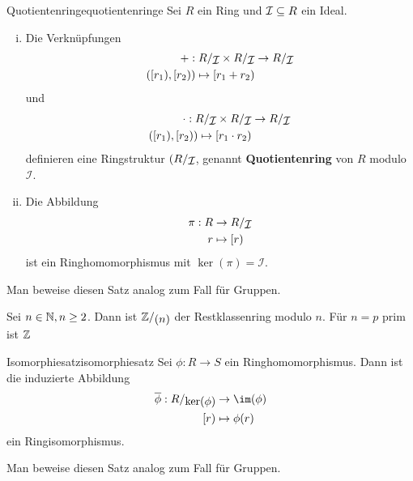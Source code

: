 \begin{satz}{Quotientenringe}{quotientenringe}
Sei $R$ ein Ring und $\mathcal{I} \subseteq R$ ein Ideal.
\begin{enumerate}[(i)]
\item Die Verknüpfungen 
\begin{equation}
\begin{split}
+: \quotient{R}{\mathcal{I}} \times \quotient{R}{\mathcal{I}} &\to \quotient{R}{\mathcal{I}}\\
([r_1), [r_2)) \mapsto [r_1 + r_2)
\end{split}
\end{equation}
und
\begin{equation}
\begin{split}
\cdot: \quotient{R}{\mathcal{I}} \times \quotient{R}{\mathcal{I}} &\to \quotient{R}{\mathcal{I}}\\
([r_1), [r_2)) \mapsto [r_1 \cdot r_2)
\end{split}
\end{equation}
definieren eine Ringstruktur $(\quotient{R}{\mathcal{I}}$, genannt \textbf{Quotientenring} von $R$ modulo $\mathcal{I}$.
\item Die Abbildung 
\begin{equation}
\begin{split}
\pi: R &\to \quotient{R}{\mathcal{I}}\\
r &\mapsto [r)
\end{split}
\end{equation}
ist ein Ringhomomorphismus mit $\ker (\pi) = \mathcal{I}$.
\end{enumerate}
\end{satz}
\begin{übung}
Man beweise diesen Satz analog zum Fall für Gruppen.
\end{übung}
\begin{beispiel}
Sei $n \in \mathbb{N}, n \geq 2$. Dann ist $\quotient{\Z}{(n)}$ der Restklassenring modulo $n$. Für $n=p$ prim ist $\mathbb{Z}$
\end{beispiel}
\begin{theorem}{Isomorphiesatz}{isomorphiesatz}
Sei $\phi: R \to S$ ein Ringhomomorphismus. Dann ist die induzierte Abbildung
\begin{equation}
\begin{split}
\overline{\phi}: \quotient{R}{\ker (\phi)} &\to \im (\phi)\\
[r) &\mapsto \phi(r)
\end{split}
\end{equation}
ein Ringisomorphismus.
\end{theorem}
\begin{übung}
Man beweise diesen Satz analog zum Fall für Gruppen.
\end{übung}

